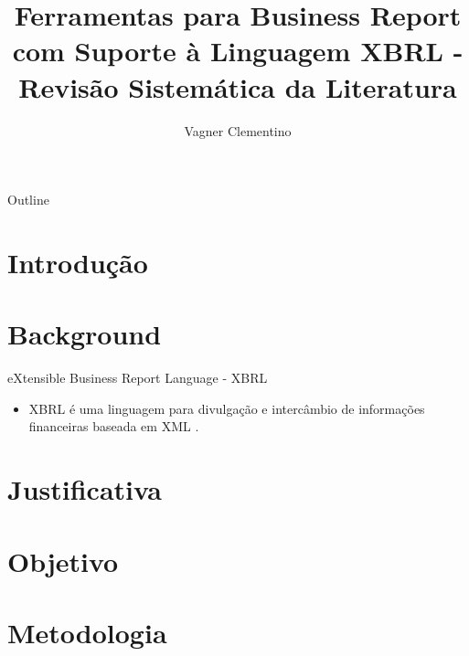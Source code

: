 \documentclass[t,14pt,mathserif]{beamer}
\title[] %
{Ferramentas para Business Report \\
com Suporte à Linguagem XBRL - \\
Revisão Sistemática da Literatura}
\subtitle
{Vagner Clementino}
\institute[] %
{
  Departamento de Ciência da Computação\\
  Universidade Federal de Minas Gerais (UFMG)\\
  Empirical Software Engineering - 2015\\
  }
\date[2015/12/16] %
\begin{document}
\begin{frame}
  \titlepage
\end{frame}

\begin{frame}{Outline}
  \tableofcontents
\end{frame}




\section{Introdução}
\section{Background}
\begin{frame}{eXtensible Business Report Language - XBRL}

    \begin{itemize}
      \item \alert{XBRL} é uma linguagem para divulgação e intercâmbio de
        informações financeiras baseada em XML \cite{xbrl_conceitos_aplicacoes}.
    \end{itemize}



\end{frame}

\section{Justificativa}
\section{Objetivo}
\section{Metodologia}
\end{document}
